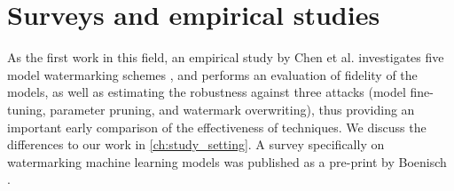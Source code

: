 \section{Surveys and empirical studies}

As the first work in this field, an empirical study by Chen et al. \cite{chen_performance_2018} investigates five model watermarking schemes \cite{uchida_embedding_2017, rouhani_deepsigns_2019,merrer_adversarial_2019, adi_turning_2018, zhang_protecting_2018}, and performs an evaluation of fidelity of the models, as well as estimating the robustness against three attacks (model fine-tuning, parameter pruning, and watermark overwriting), thus providing an important early comparison of the effectiveness of techniques. We discuss the differences to our work in \cref{ch:study_setting}.
%
A survey specifically on watermarking machine learning models was published as a pre-print by Boenisch \cite{boenisch_survey_2020}.

